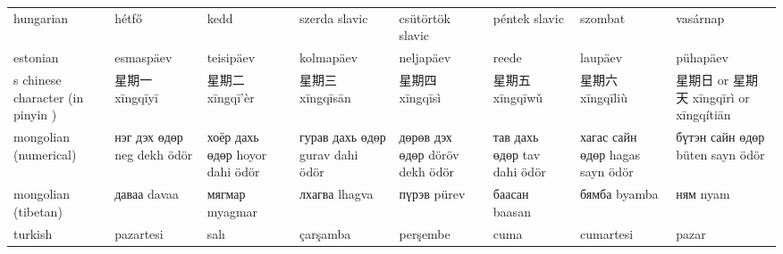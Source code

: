 \documentclass{article}
\begin{document}
\begin{tabular}{llllllll}
hungarian & hétfő & kedd & szerda slavic & csütörtök slavic & péntek slavic & szombat & vasárnap \\
estonian & esmaspäev & teisipäev & kolmapäev & neljapäev & reede & laupäev & pühapäev \\
s chinese character (in pinyin ) & 星期一 xīngqīyī & 星期二 xīngqī'èr & 星期三 xīngqīsān & 星期四 xīngqīsì & 星期五 xīngqīwǔ & 星期六 xīngqīliù & 星期日 or 星期天 xīngqīrì or xīngqítiān \\
mongolian (numerical) & нэг дэх өдөр neg dekh ödör & хоёр дахь өдөр hoyor dahi ödör & гурав дахь өдөр gurav dahi ödör & дөрөв дэх өдөр döröv dekh ödör & тав дахь өдөр tav dahi ödör & хагас сайн өдөр hagas sayn ödör & бүтэн сайн өдөр büten sayn ödör \\
mongolian (tibetan) & даваа davaa & мягмар myagmar & лхагва lhagva & пүрэв pürev & баасан baasan & бямба byamba & ням nyam \\
turkish & pazartesi & salı & çarşamba & perşembe & cuma & cumartesi & pazar \\
\bottomrule
\end{tabular}
\end{document}
